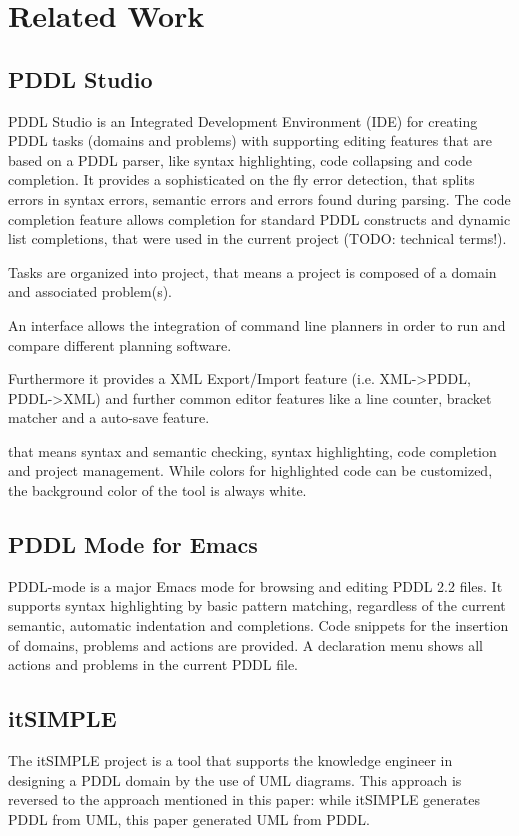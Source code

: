 \documentclass[11pt]{article}
\begin{document}
\section{Related Work}
\label{sec-2}
\subsection{PDDL Studio}
\label{sec-2-1}
PDDL Studio \parencite{plch2012inspect} is an Integrated Development
Environment (IDE) for creating PDDL tasks (domains and problems) with
supporting editing features that are based on a PDDL parser, like
syntax highlighting, code collapsing and code completion. It provides
a sophisticated on the fly error detection, that splits errors in
syntax errors, semantic errors and errors found during parsing. The
code completion feature allows completion for standard PDDL constructs
and dynamic list completions, that were used in the current project
(TODO: technical terms!).

Tasks are organized into project, that means a project is composed of
a domain and associated problem(s).

An interface allows the integration of command line planners in order
to run and compare different planning software.

Furthermore it provides a XML Export/Import feature (i.e. XML->PDDL,
PDDL->XML) and further common editor features like a line counter,
bracket matcher and a auto-save feature.

that means syntax and semantic checking, syntax highlighting, code
completion and project management. While colors for highlighted code
can be customized, the background color of the tool is always white.
\subsection{PDDL Mode for Emacs}
\label{sec-2-2}
PDDL-mode is a major Emacs mode for browsing and editing PDDL 2.2
files. It supports syntax highlighting by basic pattern matching,
regardless of the current semantic, automatic indentation and
completions. Code snippets for the insertion of domains, problems and
actions are provided. A declaration menu shows all actions and
problems in the current PDDL file.
\subsection{itSIMPLE}
\label{sec-2-3}
The itSIMPLE project is a tool that supports the knowledge engineer in
designing a PDDL domain by the use of UML diagrams. This approach is
reversed to the approach mentioned in this paper: while itSIMPLE
generates PDDL from UML, this paper generated UML from PDDL. 
\end{document}
